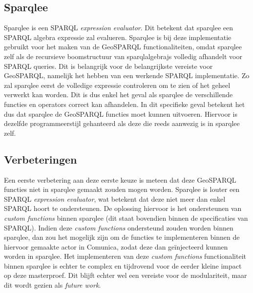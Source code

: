 \subsection{Sparqlee}
Sparqlee is een SPARQL \textit{expression evaluator}. Dit betekent dat sparqlee een SPARQL algebra expressie zal evalueren. Sparqlee is bij deze implementatie gebruikt voor het maken van de GeoSPARQL functionaliteiten, omdat sparqlee zelf als de recursieve boomstructuur van sparqlalgebrajs volledig afhandelt voor SPARQL queries. Dit is belangrijk voor de belangrijkste vereiste voor GeoSPARQL, namelijk het hebben van een werkende SPARQL implementatie. Zo zal sparqlee eerst de volledige expressie controleren om te zien of het geheel verwerkt kan worden. Dit is dus enkel het geval als sparqlee de verschillende functies en operators correct kan afhandelen. In dit specifieke geval betekent het dus dat sparqlee de GeoSPARQL functies moet kunnen uitvoeren. Hiervoor is dezelfde programmeerstijl gehanteerd als deze die reeds aanwezig is in sparqlee zelf.

\subsection{Verbeteringen}
Een eerste verbetering aan deze eerste keuze is meteen dat deze GeoSPARQL functies niet in sparqlee gemaakt zouden mogen worden. Sparqlee is louter een SPARQL \textit{expression evaluator}, wat betekent dat deze niet meer dan enkel SPARQL hoort te ondersteunen. De oplossing hiervoor is het ondersteunen van \textit{custom functions} binnen sparqlee (dit staat bovendien binnen de specificaties van SPARQL). Indien deze \textit{custom functions} ondersteund zouden worden binnen sparqlee, dan zou het mogelijk zijn om de functies te implementeren binnen de hiervoor gemaakte actor in Comunica, zodat deze dan geïnjecteerd kunnen worden in sparqlee. Het implementeren van deze \textit{custom functions} functionaliteit binnen sparqlee is echter te complex en tijdrovend voor de eerder kleine impact op deze masterproef. Dit blijft echter wel een vereiste voor de modulariteit, maar dit wordt gezien als \textit{future work}.